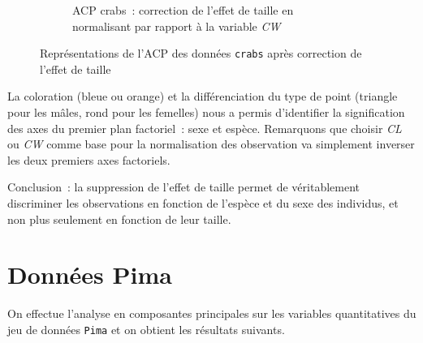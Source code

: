 \documentclass[a4paper,10pt]{report}
\begin{document}
\begin{figure}[H]
\begin{subfigure}[b]{0.5\linewidth}
		\caption{\scriptsize ACP crabs~: correction de l'effet de taille en normalisant par rapport à la variable \textit{CW}}
		\label{fig:biplot_acp_crabs_corrected_CW}
	\end{subfigure}%
	\caption{
		\small Représentations de l'ACP des données \texttt{crabs} après correction de l'effet de taille
	}
	\label{fig:biplots_crabs_corrected}%
\end{figure}

La coloration (bleue ou orange) et la différenciation du type de point (triangle pour les mâles, rond pour les femelles) nous a permis d'identifier la signification des axes du premier plan factoriel~: sexe et espèce. Remarquons que choisir \textit{CL} ou \textit{CW} comme base pour la normalisation des observation va simplement inverser les deux premiers axes factoriels.


Conclusion~: la suppression de l'effet de taille permet de véritablement discriminer les observations en fonction de l'espèce et du sexe des individus, et non plus seulement en fonction de leur taille.

\section{Données Pima}
\label{sec:2_4_ACP_Pima}


On effectue l'analyse en composantes principales sur les variables quantitatives du jeu de données \texttt{Pima} et on obtient les résultats suivants.
\end{document}
